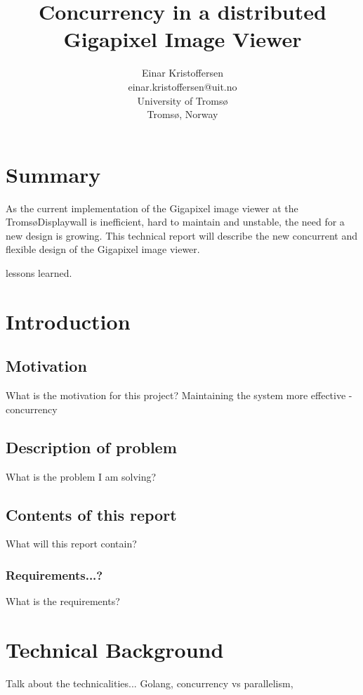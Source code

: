 \documentclass[12pt, a4paper, oneside]{article}
\begin{document}
\title{\bfseries {Concurrency in a distributed \\Gigapixel Image Viewer}}
\author{Einar Kristoffersen \\
einar.kristoffersen@uit.no\\
University of Troms\o\\
Troms\o, Norway}
\date{}

\maketitle


%
\newpage
\tableofcontents
\newpage

\section{Summary}
As the current implementation of the Gigapixel image viewer at the Troms\o Displaywall is inefficient, hard to maintain and unstable, the need for a new design is growing. This technical report will describe the new concurrent and flexible design of the Gigapixel image viewer.

lessons learned.

\section{Introduction}
\subsection{Motivation}
What is the motivation for this project?
Maintaining the system
more effective - concurrency

\subsection{Description of problem}
What is the problem I am solving?
\subsection{Contents of this report}
What will this report contain?
\subsubsection{Requirements...?}
What is the requirements?
\section{Technical Background}
Talk about the technicalities... Golang, concurrency vs parallelism,
\end{document}

